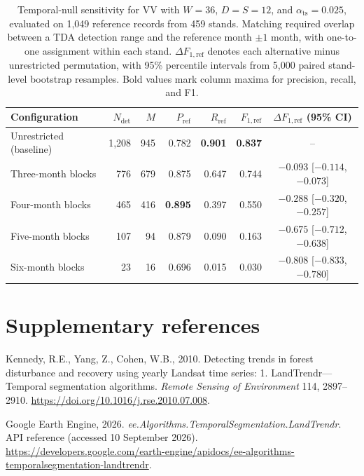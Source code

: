 \documentclass[11pt,a4paper]{article}
\begin{document}
\begin{table}[!htbp]
    \centering\small
    \setlength{\tabcolsep}{3pt}
    \caption{Temporal-null sensitivity for VV with $W=36$, $D=S=12$, and $\alpha_{\mathrm{ts}}=0.025$, evaluated on 1,049 reference records from 459 stands. Matching required overlap between a TDA detection range and the reference month $\pm1$ month, with one-to-one assignment within each stand. $\Delta F_{1,\mathrm{ref}}$ denotes each alternative minus unrestricted permutation, with 95\% percentile intervals from 5,000 paired stand-level bootstrap resamples. Bold values mark column maxima for precision, recall, and F1.}
    \label{tab:si_temporal_null}
    \begin{tabular*}{\linewidth}{@{\extracolsep{\fill}}lrrrrrc@{}}
        \toprule
        Configuration & $N_{\mathrm{det}}$ & $M$ & $P_{\mathrm{ref}}$ & $R_{\mathrm{ref}}$ & $F_{1,\mathrm{ref}}$ & $\Delta F_{1,\mathrm{ref}}$ (95\% CI) \\
        \midrule
        Unrestricted (baseline) & 1,208 & 945 & 0.782 & \textbf{0.901} & \textbf{0.837} & -- \\
        Three-month blocks & 776 & 679 & 0.875 & 0.647 & 0.744 & $-0.093$ [$-0.114$, $-0.073$] \\
        Four-month blocks & 465 & 416 & \textbf{0.895} & 0.397 & 0.550 & $-0.288$ [$-0.320$, $-0.257$] \\
        Five-month blocks & 107 & 94 & 0.879 & 0.090 & 0.163 & $-0.675$ [$-0.712$, $-0.638$] \\
        Six-month blocks & 23 & 16 & 0.696 & 0.015 & 0.030 & $-0.808$ [$-0.833$, $-0.780$] \\
        \bottomrule
    \end{tabular*}
\end{table}

\section*{Supplementary references}
\label{ref:kennedy}
Kennedy, R.E., Yang, Z., Cohen, W.B., 2010. Detecting trends in forest disturbance and recovery using yearly Landsat time series: 1. LandTrendr---Temporal segmentation algorithms. \textit{Remote Sensing of Environment} 114, 2897--2910. \url{https://doi.org/10.1016/j.rse.2010.07.008}.

\label{ref:gee}
Google Earth Engine, 2026. \textit{ee.Algorithms.TemporalSegmentation.LandTrendr}. API reference (accessed 10 September 2026). \url{https://developers.google.com/earth-engine/apidocs/ee-algorithms-temporalsegmentation-landtrendr}.
\end{document}

